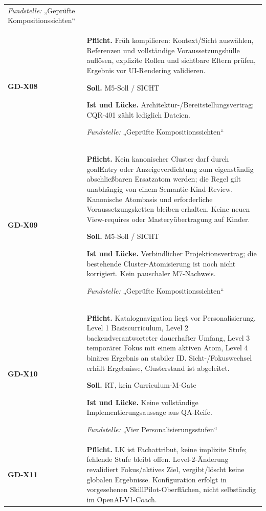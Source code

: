 \begin{longtable}{@{}P{20mm}P{128mm}@{}}
\emph{Fundstelle:} „Geprüfte Kompositionssichten“\\\addlinespace[5pt]
\label{rule:GD-X08}\textbf{GD-X08} &
\textbf{Pflicht.} Früh kompilieren: Kontext/Sicht auswählen, Referenzen und vollständige Voraussetzungshülle auflösen, explizite Rollen und sichtbare Eltern prüfen, Ergebnis vor UI-Rendering validieren.\par\smallskip
\textbf{Soll.} M5-Soll / SICHT\par\smallskip
\textbf{Ist und Lücke.} Architektur-/Bereitstellungsvertrag; CQR-401 zählt lediglich Dateien.\par\smallskip
\emph{Fundstelle:} „Geprüfte Kompositionssichten“\\\addlinespace[5pt]
\label{rule:GD-X09}\textbf{GD-X09} &
\textbf{Pflicht.} Kein kanonischer Cluster darf durch goalEntry oder Anzeigeverdichtung zum eigenständig abschließbaren Ersatzatom werden; die Regel gilt unabhängig von einem Semantic-Kind-Review. Kanonische Atombasis und erforderliche Voraussetzungsketten bleiben erhalten. Keine neuen View-requires oder Masteryübertragung auf Kinder.\par\smallskip
\textbf{Soll.} M5-Soll / SICHT\par\smallskip
\textbf{Ist und Lücke.} Verbindlicher Projektionsvertrag; die bestehende Cluster-Atomisierung ist noch nicht korrigiert. Kein pauschaler M7-Nachweis.\par\smallskip
\emph{Fundstelle:} „Geprüfte Kompositionssichten“\\\addlinespace[5pt]
\label{rule:GD-X10}\textbf{GD-X10} &
\textbf{Pflicht.} Katalognavigation liegt vor Personalisierung. Level 1 Basiscurriculum, Level 2 backendverantworteter dauerhafter Umfang, Level 3 temporärer Fokus mit einem aktiven Atom, Level 4 binäres Ergebnis an stabiler ID. Sicht-/Fokuswechsel erhält Ergebnisse, Clusterstand ist abgeleitet.\par\smallskip
\textbf{Soll.} RT, kein Curriculum-M-Gate\par\smallskip
\textbf{Ist und Lücke.} Keine vollständige Implementierungsaussage aus QA-Reife.\par\smallskip
\emph{Fundstelle:} „Vier Personalisierungsstufen“\\\addlinespace[5pt]
\label{rule:GD-X11}\textbf{GD-X11} &
\textbf{Pflicht.} LK ist Fachattribut, keine implizite Stufe; fehlende Stufe bleibt offen. Level-2-Änderung revalidiert Fokus/aktives Ziel, vergibt/löscht keine globalen Ergebnisse. Konfiguration erfolgt in vorgesehenen SkillPilot-Oberflächen, nicht selbständig im OpenAI-V1-Coach.\par\smallskip

\end{longtable}
